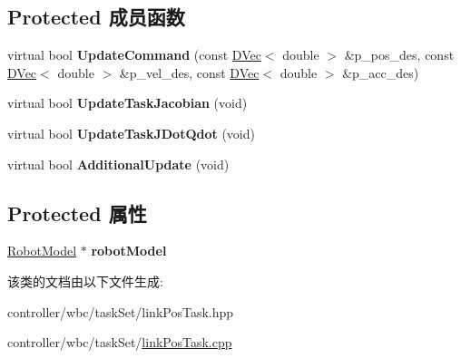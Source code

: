 \subsection*{Protected 成员函数}
\begin{DoxyCompactItemize}
\item 
\mbox{\label{classquadruped_1_1LinkPosTask_a24daaf2d9cfdfb2198f4a7aba29f8efc}} 
virtual bool {\bfseries Update\+Command} (const \hyperlink{cppTypes_8h_adad69baca3c77d5f991be5d3c063fea7}{D\+Vec}$<$ double $>$ \&p\+\_\+pos\+\_\+des, const \hyperlink{cppTypes_8h_adad69baca3c77d5f991be5d3c063fea7}{D\+Vec}$<$ double $>$ \&p\+\_\+vel\+\_\+des, const \hyperlink{cppTypes_8h_adad69baca3c77d5f991be5d3c063fea7}{D\+Vec}$<$ double $>$ \&p\+\_\+acc\+\_\+des)
\item 
\mbox{\label{classquadruped_1_1LinkPosTask_ab5a6df13f20dc557b91ecaf870e134f6}} 
virtual bool {\bfseries Update\+Task\+Jacobian} (void)
\item 
\mbox{\label{classquadruped_1_1LinkPosTask_a09dfd84a3acdb8b1d083a7e62b5e562a}} 
virtual bool {\bfseries Update\+Task\+J\+Dot\+Qdot} (void)
\item 
\mbox{\label{classquadruped_1_1LinkPosTask_a6bbd706b0575f0fc586e96ccca4ebbcc}} 
virtual bool {\bfseries Additional\+Update} (void)
\end{DoxyCompactItemize}
\subsection*{Protected 属性}
\begin{DoxyCompactItemize}
\item 
\mbox{\label{classquadruped_1_1LinkPosTask_a69cf63b4e9b9e8c290b0fe56f75a80f5}} 
\hyperlink{classquadruped_1_1RobotModel}{Robot\+Model} $\ast$ {\bfseries robot\+Model}
\end{DoxyCompactItemize}


该类的文档由以下文件生成\+:\begin{DoxyCompactItemize}
\item 
controller/wbc/task\+Set/link\+Pos\+Task.\+hpp\item 
controller/wbc/task\+Set/\hyperlink{linkPosTask_8cpp}{link\+Pos\+Task.\+cpp}\end{DoxyCompactItemize}
